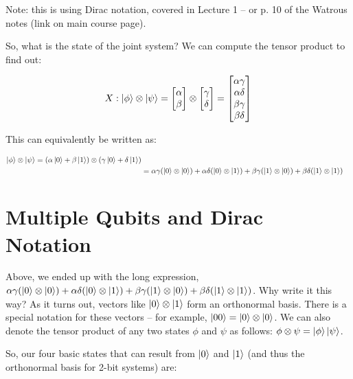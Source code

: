\documentclass[11pt]{article}
\begin{document}
Note: this is using Dirac notation, covered in Lecture 1 -- or p. 10 of the Watrous notes (link on main course page).

So, what is the state of the joint system? We can compute the tensor product to find out:


\begin {align}
X: \ket{\phi} \otimes \ket{\psi} = \begin{bmatrix}\alpha \\ \beta \end{bmatrix} \otimes \begin{bmatrix} \gamma \\ \delta \end{bmatrix} = \begin{bmatrix} \alpha \gamma \\ \alpha \delta \\ \beta \gamma \\ \beta \delta \end{bmatrix} \\
\end{align}

This can equivalently be written as: 

\begin {align}
\ket{\phi} \otimes \ket{\psi} = (\alpha \ket{0} + \beta \ket{1}) \otimes (\gamma \ket{0} + \delta \ket{1}) \\ 
& = \alpha \gamma (\ket{0} \otimes \ket{0}) + \alpha \delta (\ket{0} \otimes \ket{1}) + \beta \gamma (\ket{1} \otimes \ket{0}) + \beta \delta (\ket{1} \otimes \ket{1})
\end{align}

\section{Multiple Qubits and Dirac Notation}

Above, we ended up with the long expression, $\alpha \gamma (\ket{0} \otimes \ket{0}) + \alpha \delta (\ket{0} \otimes \ket{1}) + \beta \gamma (\ket{1} \otimes \ket{0}) + \beta \delta (\ket{1} \otimes \ket{1})$. Why write it this way? As it turns out, vectors like $\ket{0} \otimes \ket{1}$ form an orthonormal basis. There is a special notation for these vectors -- for example, $\ket{00} = \ket{0} \otimes \ket{0}$. We can also denote the tensor product of any two states $\phi$ and $\psi$ as follows: $\phi \otimes \psi = \ket{\phi} \ket{\psi}$.

\break
So, our four basic states that can result from $\ket{0}$ and $\ket{1}$ (and thus the orthonormal basis for 2-bit systems) are:
\end{document}

